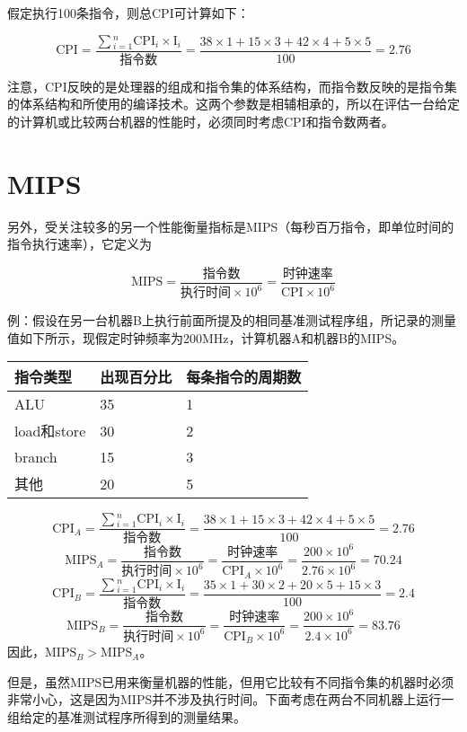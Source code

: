 假定执行100条指令，则总CPI可计算如下：

$$\text{CPI}=\frac{\sum{}^n_{i=1}\text{CPI}_i\times \text{I}_i}{\text{指令数}}=\frac{38\times1+15\times3+42\times4+5\times5}{100}=2.76$$

注意，CPI反映的是处理器的组成和指令集的体系结构，而指令数反映的是指令集的体系结构和所使用的编译技术。这两个参数是相辅相承的，所以在评估一台给定的计算机或比较两台机器的性能时，必须同时考虑CPI和指令数两者。

\section{MIPS}

另外，受关注较多的另一个性能衡量指标是MIPS（每秒百万指令，即单位时间的指令执行速率），它定义为

$$\text{MIPS}=\frac{\text{指令数}}{\text{执行时间}\times \text{10}^6}=\frac{\text{时钟速率}}{\text{CPI}\times \text{10}^6}$$

例：假设在另一台机器B上执行前面所提及的相同基准测试程序组，所记录的测量值如下所示，现假定时钟频率为200MHz，计算机器A和机器B的MIPS。

\begin{table}[htbp]
\centering
\begin{tabular}{|l|l|l|}
\hline
指令类型	& 出现百分比	& 每条指令的周期数	\\
\hline
ALU		& 35		& 1			\\
\hline
load和store	& 30		& 2			\\
\hline
branch		& 15		& 3			\\
\hline
其他		& 20		& 5			\\
\hline
\end{tabular}
\end{table}

$$\text{CPI}_A=\frac{\sum{}^n_{i=1}\text{CPI}_i\times \text{I}_i}{\text{指令数}}=\frac{38\times1+15\times3+42\times4+5\times5}{100}=2.76$$
$$\text{MIPS}_A=\frac{\text{指令数}}{\text{执行时间}\times \text{10}^6}=\frac{\text{时钟速率}}{\text{CPI}_A\times \text{10}^6}=\frac{200\times 10^6}{2.76\times 10^6}=70.24$$
$$\text{CPI}_B=\frac{\sum{}^n_{i=1}\text{CPI}_i\times \text{I}_i}{\text{指令数}}=\frac{35\times1+30\times2+20\times5+15\times3}{100}=2.4$$
$$\text{MIPS}_B=\frac{\text{指令数}}{\text{执行时间}\times \text{10}^6}=\frac{\text{时钟速率}}{\text{CPI}_B\times \text{10}^6}=\frac{200\times 10^6}{2.4\times 10^6}=83.76$$
因此，$\text{MIPS}_B>\text{MIPS}_A$。

但是，虽然MIPS已用来衡量机器的性能，但用它比较有不同指令集的机器时必须非常小心，这是因为MIPS并不涉及执行时间。下面考虑在两台不同机器上运行一组给定的基准测试程序所得到的测量结果。

